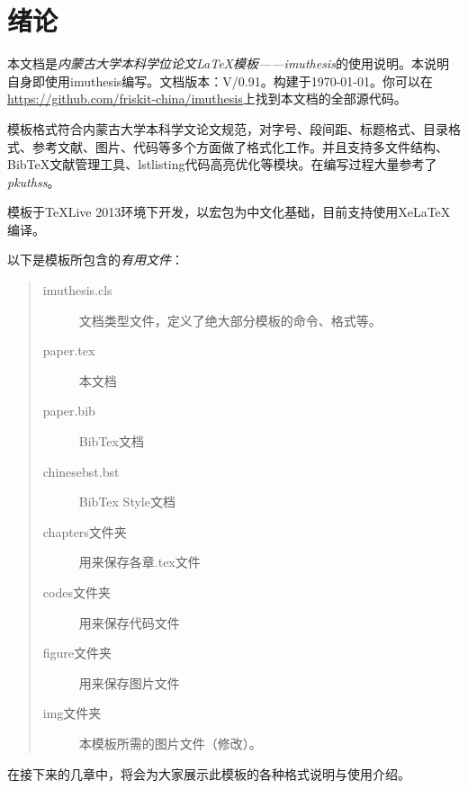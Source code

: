 \chapter{绪论}
    本文档是\emph{内蒙古大学本科学位论文\LaTeX 模板——imuthesis}的使用说明。本说明自身即使用imuthesis编写。文档版本：V/0.91。构建于\today。你可以在\url{https://github.com/friskit-china/imuthesis}上找到本文档的全部源代码。

    模板格式符合内蒙古大学本科学文论文规范，对字号、段间距、标题格式、目录格式、参考文献、图片、代码等多个方面做了格式化工作。并且支持多文件结构、BibTeX文献管理工具、lstlisting代码高亮优化等模块。在编写过程大量参考了\emph{pkuthss}。

    模板于\TeX Live 2013环境下开发，以\CTeX 宏包为中文化基础，目前支持使用XeLaTeX编译。

    以下是模板所包含的\emph{有用文件}：
    \begin{quote}
        \begin{description}
            \item [imuthesis.cls] 文档类型文件，定义了绝大部分模板的命令、格式等。
            \item [paper.tex] 本文档
            \item [paper.bib] BibTex文档
            \item [chinesebst.bst] BibTex Style文档
            \item [chapters文件夹] 用来保存各章.tex文件
            \item [codes文件夹] 用来保存代码文件
            \item [figure文件夹] 用来保存图片文件
            \item [img文件夹] 本模板所需的图片文件（修改）。 
        \end{description}
    \end{quote}
    在接下来的几章中，将会为大家展示此模板的各种格式说明与使用介绍。

